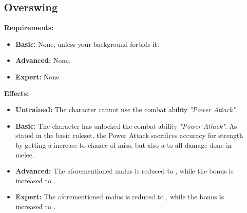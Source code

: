 \subsection{Overswing}
\begin{table}[!ht]
\centering
{}
\end{table}
\textbf{Requirements:}
\begin{itemize}
	\item \textbf{Basic:} None, unless your background forbids it.
	\item \textbf{Advanced:} None.
	\item \textbf{Expert:} None.
\end{itemize}
\textbf{Effects:}
\begin{itemize}
	\item \textbf{Untrained:} The character cannot use the combat ability \textit{"Power Attack"}.
	\item \textbf{Basic:} The character has unlocked the combat ability \textit{"Power Attack"}. As stated in the basic ruleset, the Power Attack sacrifices accuracy for strength by getting a  increase to chance of miss, but also a  to all damage done in melee.
	\item \textbf{Advanced:} The aforementioned malus is reduced to , while the bonus is increased to .
	\item \textbf{Expert:} The aforementioned malus is reduced to , while the bonus is increased to .
\end{itemize}\newpage
